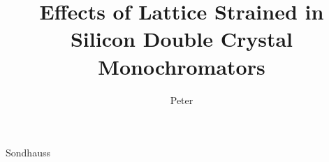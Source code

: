 \documentclass[preprint]{iucr}              %
\begin{document}



\title{Effects of Lattice Strained in Silicon Double Crystal Monochromators}


\author[a]{Peter}{Sondhauss}











\maketitle                        %
\end{document}
